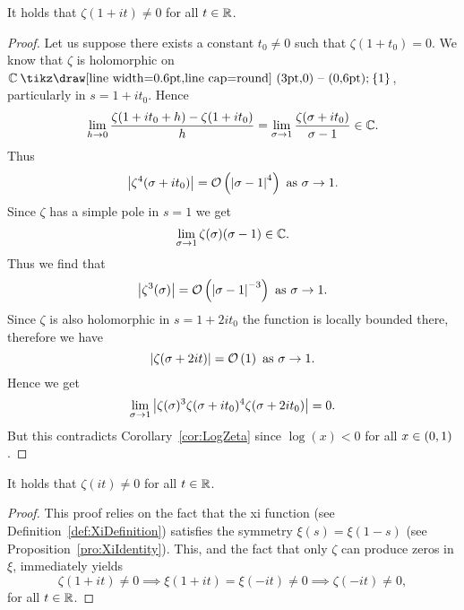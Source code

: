 \begin{theorem}
	It holds that $\zeta(1 + it) \neq 0$ for all $t \in \mathbb{R}$.
\end{theorem}
\begin{proof}
	Let us suppose there exists a constant $t_0 \neq 0$ such that $\zeta(1 + t_0) = 0$. We know that $\zeta$ is holomorphic on $\field{C} \mysetminus \{1\}$, particularly in $s = 1 + it_0$. Hence
\begin{equation*}
	\lim\limits_{h \to 0} \frac{\zeta(1 + it_0 + h) - \zeta(1 + it_0)}{h} = \lim\limits_{\sigma \to 1} \frac{\zeta(\sigma + it_0)}{\sigma - 1} \in \mathbb{C}.
\end{equation*}
	Thus
\begin{equation*}
	\left|\zeta^4(\sigma + it_0)\right| = \mathcal{O}\left(\left|\sigma - 1\right|^4\right) \text{ as } \sigma \to 1.
\end{equation*}
	Since $\zeta$ has a simple pole in $s = 1$ we get
\begin{equation*}
	\lim\limits_{\sigma \to 1}\zeta(\sigma) (\sigma - 1) \in \mathbb{C}.
\end{equation*}
	Thus we find that
\begin{equation*}
	 \left|\zeta^3(\sigma)\right| = \mathcal{O}\left(\left|\sigma - 1\right|^{-3}\right) \text{ as } \sigma \to 1.
\end{equation*}
	Since $\zeta$ is also holomorphic in $s = 1 + 2it_0$ the function is locally bounded there, therefore we have
\begin{equation*}
	 \left|\zeta(\sigma + 2it)\right| = \mathcal{O}\left(1\right) \text{ as } \sigma \to 1.
\end{equation*}
	Hence we get
\begin{equation*}
	 \lim\limits_{\sigma \to 1} \left|\zeta(\sigma)^3 \zeta(\sigma + it_0)^4 \zeta(\sigma + 2it_0)\right| = 0.
\end{equation*}
	But this contradicts Corollary~\ref{cor:LogZeta} since $\log(x) < 0$ for all $x \in \left(0 , 1\right)$.
\end{proof}


\begin{corollary}
	It holds that $\zeta(it) \neq 0$ for all $t \in \mathbb{R}$.
\end{corollary}
\begin{proof}
	This proof relies on the fact that the xi function (see Definition~\ref{def:XiDefinition}) satisfies the symmetry $\xi(s) = \xi(1 - s)$ (see Proposition~\ref{pro:XiIdentity}). This, and the fact that only $\zeta$ can produce zeros in $\xi$, immediately yields
\begin{equation*}
	\zeta(1 + it) \neq 0 \implies \xi(1 + it) = \xi(-it) \neq 0 \implies \zeta(-it) \neq 0,	
\end{equation*}
	for all $t \in \mathbb{R}$.
\end{proof}


